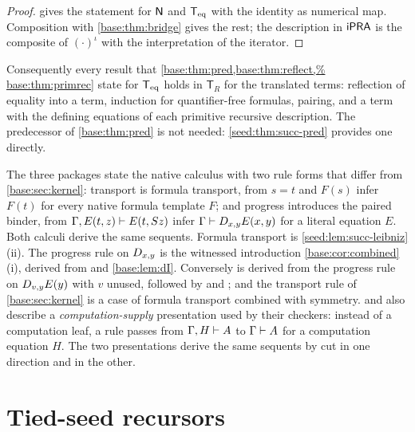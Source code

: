 \begin{proof}
 gives the statement for $\mathsf{N}$ and $\mathsf{T}_{\mathrm{eq}}$ with
the identity as numerical map. Composition with \cref{base:thm:bridge}
gives the rest; the description in $\mathsf{iPRA}$ is the composite of
$(\cdot)^{\iota}$ with the interpretation of the iterator.
\end{proof}

Consequently every result that \cref{base:thm:pred,base:thm:reflect,%
base:thm:primrec} state for $\mathsf{T}_{\mathrm{eq}}$ holds in $\mathsf{T}_R$ for the
translated terms: reflection of equality into a term, induction for
quantifier-free formulas, pairing, and a term with the defining equations
of each primitive recursive description. The predecessor of
\cref{base:thm:pred} is not needed: \cref{seed:thm:succ-pred} provides one
directly.

\begin{remark}\label{seed:rem:succ-rules}
The three packages state the native calculus with two rule forms that differ
from \cref{base:sec:kernel}: transport is formula transport, from $s=t$ and
$F(s)$ infer $F(t)$ for every native formula template $F$; and progress
introduces the paired binder, from $\Gamma,E(t,z)\vdash E(t,S z)$ infer
$\Gamma\vdash D_{x,y}E(x,y)$ for a literal equation $E$. Both calculi derive
the same sequents. Formula transport is
\cref{seed:lem:succ-leibniz}(ii). The progress rule on $D_{x,y}$ is the
witnessed introduction \cref{base:cor:combined}(i), derived from
 and \cref{base:lem:dI}. Conversely  is
derived from the progress rule on $D_{v,y}E(y)$ with $v$ unused, followed by
 and ; and the transport rule of
\cref{base:sec:kernel} is a case of formula transport combined with symmetry.
 and  also describe a
\emph{computation-supply} presentation used by their checkers: instead of a
computation leaf, a rule passes from $\Gamma,H\vdash A$ to
$\Gamma\vdash A$ for a computation equation $H$. The two presentations
derive the same sequents by cut in one direction and  in the
other.
\end{remark}

\section{Tied-seed recursors}
\label{seed:sec:tied}

